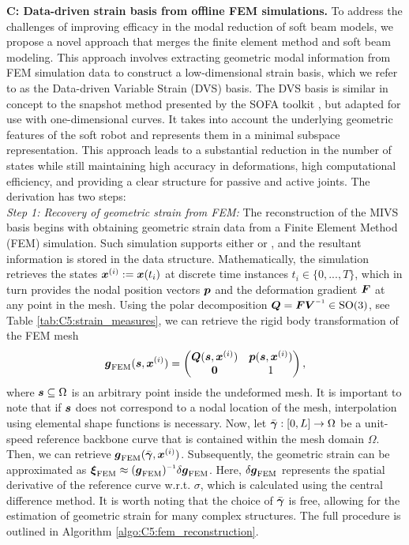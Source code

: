 \label{sec:C5:femPODbasis}
\textbf{C: Data-driven strain basis from offline FEM simulations.} To address the challenges of improving efficacy in the modal reduction of soft beam models, we propose a novel approach that merges the finite element method and soft beam modeling. This approach involves extracting geometric modal information from FEM simulation data to construct a low-dimensional strain basis, which we refer to as the Data-driven Variable Strain (DVS) basis. The DVS basis is similar in concept to the snapshot method presented by the SOFA toolkit \cite{Duriez2016,Coevoet2017,Goury2018}, but adapted for use with one-dimensional curves. It takes into account the underlying geometric features of the soft robot and represents them in a minimal subspace representation. This approach leads to a substantial reduction in the number of states while still maintaining high accuracy in deformations, high computational efficiency, and providing a clear structure for passive and active joints. The derivation has two steps: \\

\textit{Step 1: Recovery of geometric strain from FEM:} The reconstruction of the MIVS basis begins with obtaining geometric strain data from a Finite Element Method (FEM) simulation. Such simulation supports either  or , and the resultant information is stored in the  data structure. Mathematically, the simulation retrieves the states ${\boldsymbol{x}}^{(i)}:={\boldsymbol{x}}(t_i)$ at discrete time instances $t_i \in \{0,...,T\}$, which in turn provides the nodal position vectors ${\boldsymbol{p}}$ and the deformation gradient ${\boldsymbol{F}}$ at any point in the mesh. Using the polar decomposition $\QB = \FB\VB \inv \in \textrm{SO}(3)$, see Table \ref{tab:C5:strain_measures}, we can retrieve the rigid body transformation of the FEM mesh
%
\begin{equation}
{\boldsymbol{g}}_{\textrm{FEM}}({\boldsymbol{s}}, {\boldsymbol{x}}^{(i)}) = \begin{pmatrix} {\boldsymbol{Q}}({\boldsymbol{s}},{\boldsymbol{x}}^{(i)}) & {\boldsymbol{p}}({\boldsymbol{s}},{\boldsymbol{x}}^{(i)}) \\ \boldsymbol{0} & 1 \end{pmatrix},
\end{equation}
%
where ${\boldsymbol{s}} \subseteq \Omega$ is an arbitrary point inside the undeformed mesh. It is important to note that if ${\boldsymbol{s}}$ does not correspond to a nodal location of the mesh, interpolation using elemental shape functions is necessary. Now, let $\bar{{\boldsymbol{\gamma}}}: [0,L] \to \Omega$ be a unit-speed reference backbone curve that is contained within the mesh domain $\Omega$. Then, we can retrieve ${\boldsymbol{g}}_{\textrm{FEM}}(\bar{{\boldsymbol{\gamma}}},{\boldsymbol{x}}^{(i)})$. Subsequently, the geometric strain can be approximated as $\xiB_{\textrm{FEM}} \approx (\gB_{\textrm{FEM}})\inv \delta \gB_{\textrm{FEM}}$. Here, $\delta {\boldsymbol{g}}_{\textrm{FEM}}$ represents the spatial derivative of the reference curve w.r.t. $\sigma$, which is calculated using the central difference method. It is worth noting that the choice of $\bar{{\boldsymbol{\gamma}}}$ is free, allowing for the estimation of geometric strain for many complex structures. The full procedure is outlined in Algorithm \ref{algo:C5:fem_reconstruction}. \vspace{2mm}

